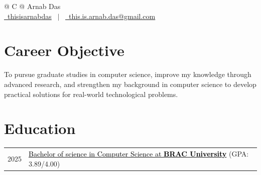 \documentclass[a4paper,12pt]{article}
\begin{document}
\pagestyle{empty}



\begin{tabularx}{\linewidth}{@{} C @{}}
    \Huge{Arnab Das}                                                                                            \\[7.5pt]
    \href{https://github.com/thisisarnabdas}{\raisebox{-0.05\height}\faGithub\ thisisarnabdas} \ $|$ \
    \href{mailto:this.is.arnab.das@gmail.com}{\raisebox{-0.05\height}\faEnvelope \ this.is.arnab.das@gmail.com} \\
\end{tabularx}


\section{Career Objective}
To pursue graduate studies in computer science, improve my knowledge through advanced research, and strengthen my background in computer science to develop practical solutions for real-world technological problems.

\section{Education}
\begin{tabularx}{\linewidth}{@{}l X@{}}
    2025 & \href{https://drive.google.com/file/d/1VTK5ltNdR83h-0LRuFuUIcngbCqoCtQM/view?usp=sharing}{\textcolor{black}{Bachelor of science in Computer Science at \textbf{BRAC University}}} \hfill (GPA: 3.89/4.00) \\
\end{tabularx}
\end{document}
